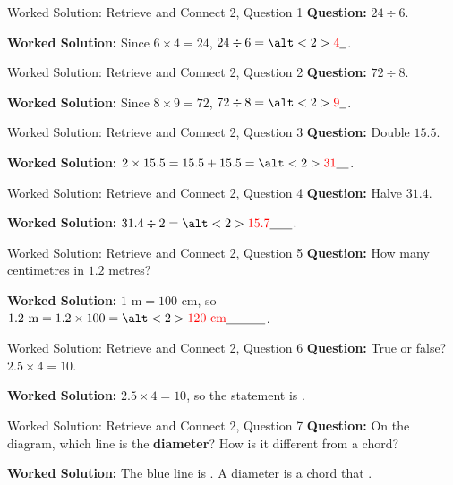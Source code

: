 \documentclass{beamer}
\newcommand{\ablank}[1]{%
  \alt<2>{\textcolor{red}{#1}}{\underline{\phantom{#1}}}%
}
\newcommand{\ashow}[1]{\uncover<2->{\textcolor{red}{\small #1}}}
\begin{document}
\begin{frame}{Worked Solution: Retrieve and Connect 2, Question 1}
\hypertarget{work-st2}{}
\small
\textbf{Question:} \(24\div6\).

\textbf{Worked Solution:} Since \(6\times4=24\), \(24\div6=\ablank{4}\).
\end{frame}

\begin{frame}{Worked Solution: Retrieve and Connect 2, Question 2}
\small
\textbf{Question:} \(72\div8\).

\textbf{Worked Solution:} Since \(8\times9=72\), \(72\div8=\ablank{9}\).
\end{frame}

\begin{frame}{Worked Solution: Retrieve and Connect 2, Question 3}
\small
\textbf{Question:} Double \(15.5\).

\textbf{Worked Solution:} \(2\times15.5=15.5+15.5=\ablank{31}\).
\end{frame}

\begin{frame}{Worked Solution: Retrieve and Connect 2, Question 4}
\small
\textbf{Question:} Halve \(31.4\).

\textbf{Worked Solution:} \(31.4\div2=\ablank{15.7}\).
\end{frame}

\begin{frame}{Worked Solution: Retrieve and Connect 2, Question 5}
\small
\textbf{Question:} How many centimetres in \(1.2\) metres?

\textbf{Worked Solution:} \(1\text{ m}=100\text{ cm}\), so
\(1.2\text{ m}=1.2\times100=\ablank{120\text{ cm}}\).
\end{frame}

\begin{frame}{Worked Solution: Retrieve and Connect 2, Question 6}
\small
\textbf{Question:} True or false? \(2.5\times4=10\).

\textbf{Worked Solution:} \(2.5\times4=10\), so the statement is \ablank{True}.
\end{frame}

\begin{frame}{Worked Solution: Retrieve and Connect 2, Question 7}
\small
\textbf{Question:} On the diagram, which line is the \textbf{diameter}? How is it different from a chord?

\begin{center}
\end{center}

\textbf{Worked Solution:} The blue line is \ashow{the diameter}. A diameter is a chord that \ashow{passes through the centre}.
\end{frame}
\end{document}
